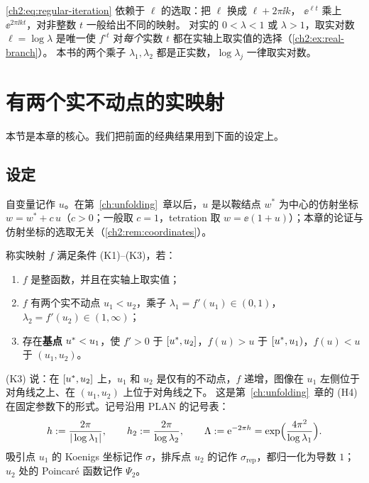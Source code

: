 \begin{remark}\label{ch2:rem:branch-loglambda}
\eqref{ch2:eq:regular-iteration} 依赖于 $\ell$ 的选取：把 $\ell$ 换成 $\ell+2\pi\ii k$，
$\ee^{\ell t}$ 乘上 $\ee^{2\pi\ii kt}$，对非整数 $t$ 一般给出不同的映射。
对实的 $0<\lambda<1$ 或 $\lambda>1$，取实对数 $\ell=\log\lambda$ 是唯一使 $f^{\circ t}$ 对\emph{每个}实数 $t$ 都在实轴上取实值的选择（\cref{ch2:ex:real-branch}）。
本书的两个乘子 $\lambda_1,\lambda_2$ 都是正实数，$\log\lambda_j$ 一律取实对数。
\end{remark}

\section{有两个实不动点的实映射}\label{ch2:sec:regular}

本节是本章的核心。我们把前面的经典结果用到下面的设定上。

\subsection{设定}

自变量记作 $u$。在第~\ref{ch:unfolding}~章以后，$u$ 是以鞍结点 $w^*$ 为中心的仿射坐标 $w=w^*+c\,u$（$c>0$；一般取 $c=1$，tetration 取 $w=\ee(1+u)$）；本章的论证与仿射坐标的选取无关（\cref{ch2:rem:coordinates}）。

\begin{definition}[条件 (K1)--(K3)]\label{ch2:def:hyp}
称实映射 $f$ 满足条件 (K1)--(K3)，若：
\begin{enumerate}[label=(K\arabic*),leftmargin=3em]
\item $f$ 是整函数，并且在实轴上取实值；
\item $f$ 有两个实不动点 $u_1<u_2$，乘子 $\lambda_1=f'(u_1)\in(0,1)$，$\lambda_2=f'(u_2)\in(1,\infty)$；
\item 存在\textbf{基点} $u^{*}<u_1$，使 $f'>0$ 于 $[u^{*},u_2]$，$f(u)>u$ 于 $[u^{*},u_1)$，$f(u)<u$ 于 $(u_1,u_2)$。
\end{enumerate}
\end{definition}

(K3) 说：在 $[u^{*},u_2]$ 上，$u_1$ 和 $u_2$ 是仅有的不动点，$f$ 递增，图像在 $u_1$ 左侧位于对角线之上、在 $(u_1,u_2)$ 上位于对角线之下。
这是第~\ref{ch:unfolding}~章的 (H4) 在固定参数下的形式。记号沿用 PLAN 的记号表：
\[
  h:=\frac{2\pi}{|\log\lambda_1|},\qquad h_2:=\frac{2\pi}{\log\lambda_2},\qquad \Lambda:=\mathrm{e}^{-2\pi h}=\exp\Bigl(\frac{4\pi^2}{\log\lambda_1}\Bigr).
\]
吸引点 $u_1$ 的 Koenigs 坐标记作 $\sigma$，排斥点 $u_2$ 的记作 $\sigma_{\mathrm{rep}}$，都归一化为导数 $1$；$u_2$ 处的 Poincaré 函数记作 $\Psi_2$。

